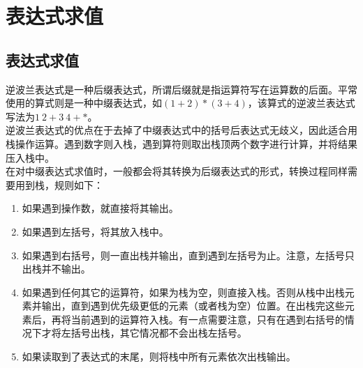\newpage

\section{表达式求值}

\subsection{表达式求值}

逆波兰表达式是一种后缀表达式，所谓后缀就是指运算符写在运算数的后面。平常使用的算式则是一种中缀表达式，如$ (1 + 2) * (3 + 4) $，该算式的逆波兰表达式写法为$ 1\ 2 + 3\ 4 + * $。\\

逆波兰表达式的优点在于去掉了中缀表达式中的括号后表达式无歧义，因此适合用栈操作运算。遇到数字则入栈，遇到算符则取出栈顶两个数字进行计算，并将结果压入栈中。\\

在对中缀表达式求值时，一般都会将其转换为后缀表达式的形式，转换过程同样需要用到栈，规则如下：

\begin{enumerate}
	\item 如果遇到操作数，就直接将其输出。

	\item 如果遇到左括号，将其放入栈中。

	\item 如果遇到右括号，则一直出栈并输出，直到遇到左括号为止。注意，左括号只出栈并不输出。

	\item 如果遇到任何其它的运算符，如果为栈为空，则直接入栈。否则从栈中出栈元素并输出，直到遇到优先级更低的元素（或者栈为空）位置。在出栈完这些元素后，再将当前遇到的运算符入栈。有一点需要注意，只有在遇到右括号的情况下才将左括号出栈，其它情况都不会出栈左括号。

	\item 如果读取到了表达式的末尾，则将栈中所有元素依次出栈输出。
\end{enumerate}

